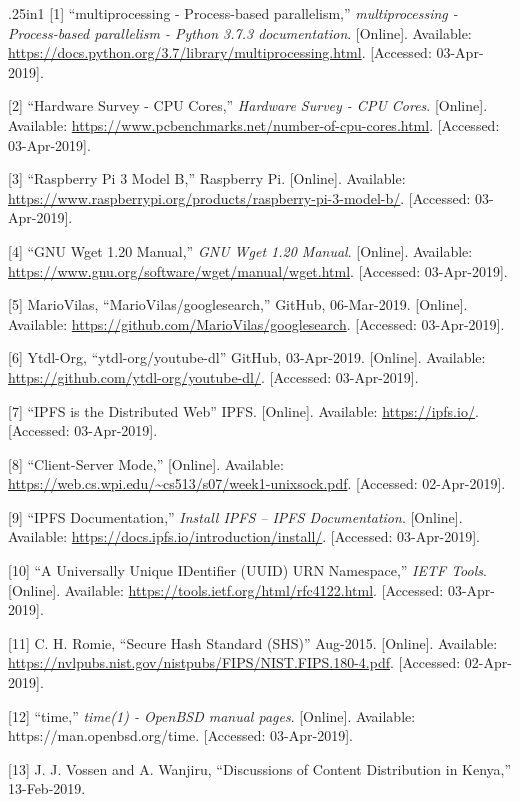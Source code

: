\documentclass{article}
\begin{document}
\begin{hangparas}{.25in}{1}
[1] ``multiprocessing - Process-based parallelism,''
\textit{multiprocessing - Process-based parallelism - Python 3.7.3
  documentation}. [Online]. Available:
\url{https://docs.python.org/3.7/library/multiprocessing.html}. [Accessed:
03-Apr-2019].

[2] ``Hardware Survey - CPU Cores,'' \textit{Hardware Survey - CPU Cores}. [Online]. Available: \url{https://www.pcbenchmarks.net/number-of-cpu-cores.html}. [Accessed: 03-Apr-2019]. 

[3] ``Raspberry Pi 3 Model B,'' Raspberry Pi. [Online]. Available:
\url{https://www.raspberrypi.org/products/raspberry-pi-3-model-b/}. [Accessed:
03-Apr-2019].

[4] ``GNU Wget 1.20 Manual,'' \textit{GNU Wget 1.20
  Manual}. [Online]. Available:
\url{https://www.gnu.org/software/wget/manual/wget.html}. [Accessed:
03-Apr-2019].

[5] MarioVilas, ``MarioVilas/googlesearch,'' GitHub,
06-Mar-2019. [Online]. Available:
\url{https://github.com/MarioVilas/googlesearch}. [Accessed:
03-Apr-2019].

[6] Ytdl-Org, ``ytdl-org/youtube-dl'' GitHub,
03-Apr-2019. [Online]. Available:
\url{https://github.com/ytdl-org/youtube-dl/}. [Accessed:
03-Apr-2019].

[7] ``IPFS is the Distributed Web'' IPFS. [Online]. Available:
\url{https://ipfs.io/}. [Accessed: 03-Apr-2019].

[8] ``Client-Server Mode,'' [Online]. Available:
\url{https://web.cs.wpi.edu/~cs513/s07/week1-unixsock.pdf}. [Accessed:
02-Apr-2019].

[9] ``IPFS Documentation,'' \textit{Install IPFS – IPFS Documentation}. [Online]. Available: \url{https://docs.ipfs.io/introduction/install/}. [Accessed: 03-Apr-2019]. 

[10] ``A Universally Unique IDentifier (UUID) URN Namespace,''
\textit{IETF Tools}. [Online]. Available:
\url{https://tools.ietf.org/html/rfc4122.html}. [Accessed:
03-Apr-2019].

[11] C. H. Romie, ``Secure Hash Standard (SHS)'' Aug-2015. [Online]. Available: \url{https://nvlpubs.nist.gov/nistpubs/FIPS/NIST.FIPS.180-4.pdf}. [Accessed: 02-Apr-2019].

[12] ``time,'' \textit{time(1) - OpenBSD manual pages}. [Online]. Available: https://man.openbsd.org/time. [Accessed: 03-Apr-2019].

[13] J. J. Vossen and A. Wanjiru, ``Discussions of Content
Distribution in Kenya,'' 13-Feb-2019.
\end{hangparas}
\end{document}
